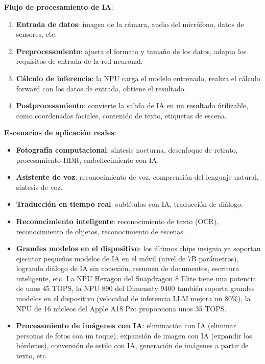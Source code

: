\textbf{Flujo de procesamiento de IA}:

\begin{enumerate}
  \item \textbf{Entrada de datos}: imagen de la cámara, audio del micrófono, datos de sensores, etc.
  \item \textbf{Preprocesamiento}: ajusta el formato y tamaño de los datos, adapta los requisitos de entrada de la red neuronal.
  \item \textbf{Cálculo de inferencia}: la NPU carga el modelo entrenado, realiza el cálculo forward con los datos de entrada, obtiene el resultado.
  \item \textbf{Postprocesamiento}: convierte la salida de IA en un resultado útilizable, como coordenadas faciales, contenido de texto, etiquetas de escena.
\end{enumerate}

\textbf{Escenarios de aplicación reales}:

\begin{itemize}
  \item \textbf{Fotografía computacional}: síntesis nocturna, desenfoque de retrato, procesamiento HDR, embellecimiento con IA.
  \item \textbf{Asistente de voz}: reconocimiento de voz, comprensión del lenguaje natural, síntesis de voz.
  \item \textbf{Traducción en tiempo real}: subtítulos con IA, traducción de diálogo.
  \item \textbf{Reconocimiento inteligente}: reconocimiento de texto (OCR), reconocimiento de objetos, reconocimiento de escenas.
  \item \textbf{Grandes modelos en el dispositivo}: los últimos chips insignia ya soportan ejecutar pequeños modelos de IA en el móvil (nivel de 7B parámetros), logrando diálogo de IA sin conexión, resumen de documentos, escritura inteligente, etc. La NPU Hexagon del Snapdragon 8 Elite tiene una potencia de unos 45 TOPS, la NPU 890 del Dimensity 9400 también soporta grandes modelos en el dispositivo (velocidad de inferencia LLM mejora un 80\%), la NPU de 16 núcleos del Apple A18 Pro proporciona unos 35 TOPS.
  \item \textbf{Procesamiento de imágenes con IA}: eliminación con IA (eliminar personas de fotos con un toque), expansión de imagen con IA (expandir los bórdenes), conversión de estilo con IA, generación de imágenes a partir de texto, etc.
\end{itemize}

